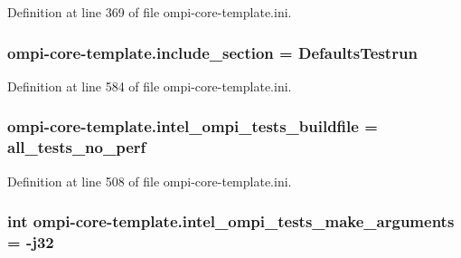 Definition at line 369 of file ompi-\/core-\/template.\-ini.

\hypertarget{namespaceompi-core-template_a5f849a852d4e18682700823c6a1cd387}{
\subsubsection[{include\-\_\-section}]{\setlength{\rightskip}{0pt plus 5cm}ompi-\/core-\/template.\-include\-\_\-section = Defaults\-Testrun}}\label{namespaceompi-core-template_a5f849a852d4e18682700823c6a1cd387}


Definition at line 584 of file ompi-\/core-\/template.\-ini.

\hypertarget{namespaceompi-core-template_a9a520c9ab3479f4c752dd61fa30f84ad}{
\subsubsection[{intel\-\_\-ompi\-\_\-tests\-\_\-buildfile}]{\setlength{\rightskip}{0pt plus 5cm}ompi-\/core-\/template.\-intel\-\_\-ompi\-\_\-tests\-\_\-buildfile = all\-\_\-tests\-\_\-no\-\_\-perf}}\label{namespaceompi-core-template_a9a520c9ab3479f4c752dd61fa30f84ad}


Definition at line 508 of file ompi-\/core-\/template.\-ini.

\hypertarget{namespaceompi-core-template_a40c7b7a488e20c19bcf9d376fc8c0020}{
\subsubsection[{intel\-\_\-ompi\-\_\-tests\-\_\-make\-\_\-arguments}]{\setlength{\rightskip}{0pt plus 5cm}int ompi-\/core-\/template.\-intel\-\_\-ompi\-\_\-tests\-\_\-make\-\_\-arguments = -\/j32}}\label{namespaceompi-core-template_a40c7b7a488e20c19bcf9d376fc8c0020}


